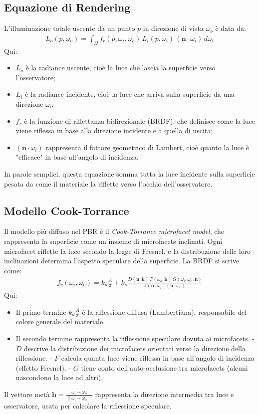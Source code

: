 \documentclass[12pt,a4paper,openright,twoside]{book}
\begin{document}
\subsection*{Equazione di Rendering}
L'illuminazione totale uscente da un punto $p$ in direzione di vista $\omega_o$ è data da:
\begin{align*}
L_o(p,\omega_o) = \int_{\Omega} f_r(p,\omega_i,\omega_o) \, L_i(p,\omega_i)\, (\mathbf{n}\cdot\omega_i)\,d\omega_i
\end{align*}
\noindent
Qui:
\begin{itemize}
    \item $L_o$ è la radiance uscente, cioè la luce che lascia la superficie verso l'osservatore;
    \item $L_i$ è la radiance incidente, cioè la luce che arriva sulla superficie da una direzione $\omega_i$;
    \item $f_r$ è la funzione di riflettanza bidirezionale (BRDF), che definisce come la luce viene riflessa in base alla direzione incidente e a quella di uscita;
    \item $(\mathbf{n}\cdot\omega_i)$ rappresenta il fattore geometrico di Lambert, cioè quanto la luce è "efficace" in base all'angolo di incidenza.
\end{itemize}
In parole semplici, questa equazione somma tutta la luce incidente sulla superficie pesata da come il materiale
la riflette verso l'occhio dell'osservatore.

\subsection*{Modello Cook-Torrance}
Il modello più diffuso nel PBR è il \emph{Cook-Torrance microfacet model}, che rappresenta la superficie come un insieme
di microfacets inclinati. Ogni microfacet riflette la luce secondo la legge di Fresnel, e la distribuzione delle
loro inclinazioni determina l'aspetto speculare della superficie.
La BRDF si scrive come:
\begin{align*}
f_r(\omega_i,\omega_o) = k_d \frac{A}{\pi} +
k_s \frac{D(\mathbf{n},\mathbf{h})\,F(\omega_o,\mathbf{h})\,G(\omega_i,\omega_o,\mathbf{n})}
{4(\mathbf{n}\cdot\omega_i)(\mathbf{n}\cdot\omega_o)}
\end{align*}
\noindent
Qui:
\begin{itemize}
    \item Il primo termine $k_d \frac{A}{\pi}$ è la riflessione diffusa (Lambertiana), responsabile del colore generale del materiale.
    \item Il secondo termine rappresenta la riflessione speculare dovuta ai microfacets.
      - $D$ descrive la distribuzione dei microfacets orientati verso la direzione della riflessione.
      - $F$ calcola quanta luce viene riflessa in base all'angolo di incidenza (effetto Fresnel).
      - $G$ tiene conto dell'auto-occlusione tra microfacets (alcuni nascondono la luce ad altri).
\end{itemize}
Il vettore metà $\mathbf{h} = \frac{\omega_i+\omega_o}{\|\omega_i+\omega_o\|}$ rappresenta la direzione intermedia
tra luce e osservatore, usata per calcolare la riflessione speculare.
\end{document}
